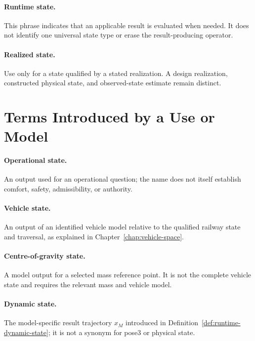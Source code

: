 \paragraph{Runtime state.}
\label{def:taxonomy-runtime-state}
This phrase indicates that an applicable result is evaluated when needed. It
does not identify one universal state type or erase the result-producing
operator.

\paragraph{Realized state.}
\label{def:taxonomy-realized-state}
Use only for a state qualified by a stated realization. A design realization,
constructed physical state, and observed-state estimate remain distinct.

\section{Terms Introduced by a Use or Model}

\paragraph{Operational state.}
\label{def:taxonomy-operational-state}
An output used for an operational question; the name does not itself establish
comfort, safety, admissibility, or authority.

\paragraph{Vehicle state.}
\label{def:taxonomy-vehicle-state}
An output of an identified vehicle model relative to the qualified railway
state and traversal, as explained in Chapter~\ref{chap:vehicle-space}.

\paragraph{Centre-of-gravity state.}
\label{def:taxonomy-cg-state}
A model output for a selected mass reference point. It is not the complete
vehicle state and requires the relevant mass and vehicle model.

\paragraph{Dynamic state.}
\label{def:taxonomy-dynamic-state}
The model-specific result trajectory \(x_M\) introduced in
Definition~\ref{def:runtime-dynamic-state}; it is not a synonym for pose3 or physical
state.

